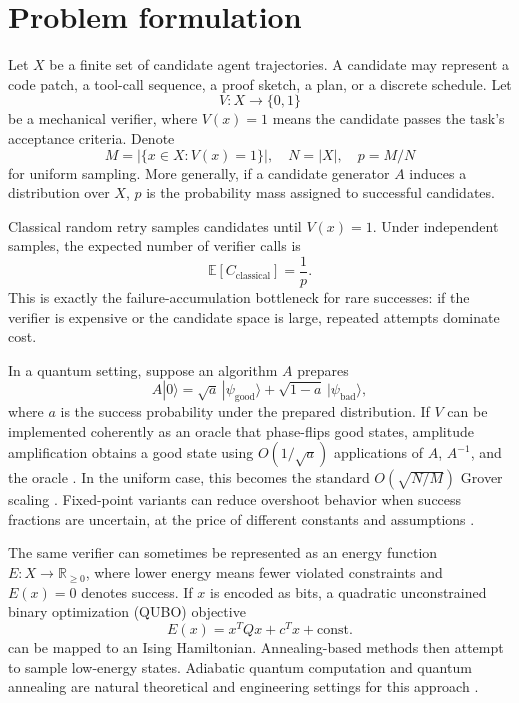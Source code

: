 \documentclass[11pt]{article}
\begin{document}
\section{Problem formulation}

Let $X$ be a finite set of candidate agent trajectories. A candidate may represent a code patch, a tool-call sequence, a proof sketch, a plan, or a discrete schedule. Let
\begin{equation}
  V:X\rightarrow\{0,1\}
\end{equation}
be a mechanical verifier, where $V(x)=1$ means the candidate passes the task's acceptance criteria. Denote
\begin{equation}
  M = |\{x\in X: V(x)=1\}|, \quad N=|X|, \quad p=M/N
\end{equation}
for uniform sampling. More generally, if a candidate generator $A$ induces a distribution over $X$, $p$ is the probability mass assigned to successful candidates.

Classical random retry samples candidates until $V(x)=1$. Under independent samples, the expected number of verifier calls is
\begin{equation}
  \mathbb{E}[C_{\mathrm{classical}}]=\frac{1}{p}.
\end{equation}
This is exactly the failure-accumulation bottleneck for rare successes: if the verifier is expensive or the candidate space is large, repeated attempts dominate cost.

In a quantum setting, suppose an algorithm $A$ prepares
\begin{equation}
  A|0\rangle = \sqrt{a}\,|\psi_{\mathrm{good}}\rangle + \sqrt{1-a}\,|\psi_{\mathrm{bad}}\rangle,
\end{equation}
where $a$ is the success probability under the prepared distribution. If $V$ can be implemented coherently as an oracle that phase-flips good states, amplitude amplification obtains a good state using $O(1/\sqrt{a})$ applications of $A$, $A^{-1}$, and the oracle \cite{brassard2002amplitude}. In the uniform case, this becomes the standard $O(\sqrt{N/M})$ Grover scaling \cite{grover1996fast}. Fixed-point variants can reduce overshoot behavior when success fractions are uncertain, at the price of different constants and assumptions \cite{yoder2014fixed}.

The same verifier can sometimes be represented as an energy function $E:X\rightarrow\mathbb{R}_{\ge 0}$, where lower energy means fewer violated constraints and $E(x)=0$ denotes success. If $x$ is encoded as bits, a quadratic unconstrained binary optimization (QUBO) objective
\begin{equation}
  E(x)=x^TQx+c^Tx+\mathrm{const.}
\end{equation}
can be mapped to an Ising Hamiltonian. Annealing-based methods then attempt to sample low-energy states. Adiabatic quantum computation and quantum annealing are natural theoretical and engineering settings for this approach \cite{farhi2000adiabatic,albash2018adiabatic,dwaveDocsAnnealing}.
\end{document}
